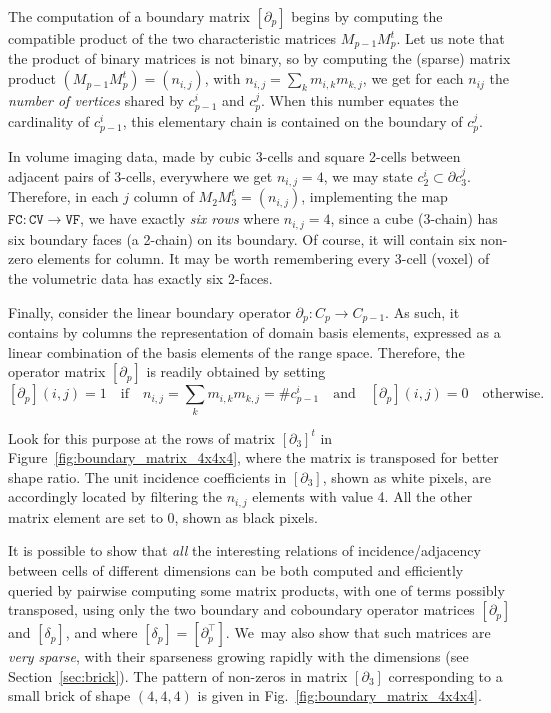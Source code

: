 The computation of a boundary matrix $[\partial_p]$ begins by computing the compatible product of the two characteristic matrices $M_{p-1}M_{p}^t$.
Let us note that the product of binary matrices is not binary, so by computing the (sparse) matrix product $(M_{p-1} M_{p}^t) = (n_{i,j})$, with $n_{i,j} = \sum_{k} m_{i,k}m_{k,j}$, we get for each $n_{ij}$ the \emph{number of vertices} shared by $c_{p-1}^i$ and $c_{p}^j$. When this number equates the cardinality of $c_{p-1}^i$, this elementary chain is contained on the boundary of $c_{p}^j$. 

In volume imaging data, made by cubic 3-cells and square 2-cells between adjacent pairs of 3-cells, everywhere we get  $n_{i,j}=4$, we may state $c_{2}^i\subset\partial c_{3}^j$. 
Therefore, in each $j$ column of $M_{2} M_{3}^t = (n_{i,j})$, implementing the map $\texttt{FC} : \texttt{CV} \to \texttt{VF}$, we have exactly \emph{six rows} where  $n_{i,j} = 4$, since a cube (3-chain) has six boundary faces (a 2-chain) on its boundary. 
Of course, it will contain six non-zero elements for column.  It may be worth remembering every 3-cell (voxel) of the volumetric data has exactly six 2-faces. 

Finally, consider the linear boundary operator $\partial_p : C_p \to C_{p-1}$. As such, it contains by columns the representation of domain basis elements, expressed as a linear combination of the basis elements of the range space. Therefore, the operator matrix $[\partial_p]$ is readily obtained by setting 
\[
[\partial_p](i,j)=1\quad\mbox{if}\quad n_{i,j} = \sum_{k} m_{i,k}m_{k,j}=\texttt{\#}c^i_{p-1} \quad\mbox{and}\quad [\partial_p](i,j)=0 \quad\mbox{otherwise}.  
\]

Look for this purpose at the rows of matrix $[\partial_3]^t$ in Figure~\ref{fig:boundary_matrix_4x4x4}, where the matrix is  transposed for better shape ratio.
The unit incidence coefficients in $\left[\partial_3\right]$, shown as white pixels, are accordingly located by filtering the $n_{i,j}$ elements with value 4. All the other matrix element are set to 0, shown as black pixels. 

It is possible to show that \emph{all} the interesting relations of incidence/adjacency between cells of different dimensions can be both computed and efficiently queried by pairwise computing some matrix products, with one of terms possibly transposed, using only the two boundary and coboundary operator matrices $[\partial_p]$ and $[\delta_p]$, and where $[\delta_p] = [\partial_p^\top]$. We~may also show that such matrices are \emph{very sparse}, with their sparseness growing rapidly with the dimensions (see Section~\ref{sec:brick}). The pattern of non-zeros in matrix $[\partial_3]$ corresponding to a small brick of shape $(4,4,4)$ is given in Fig.~\ref{fig:boundary_matrix_4x4x4}.

